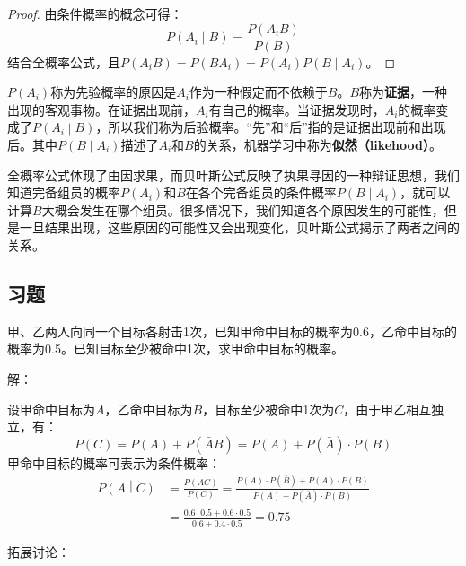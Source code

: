 \begin{proof}
由条件概率的概念可得：
\[
P\left( A_i \middle| B \right) =\frac{P\left( A_iB \right)}{P\left( B \right)}
\]
结合全概率公式，且$P\left( A_iB \right) =P\left( BA_i \right) =P\left( A_i \right) P\left( B \middle| A_i \right) $。
\end{proof}

$P\left( A_i \right) $称为先验概率的原因是$A_i$作为一种假定而不依赖于$B$。$B$称为{\bf 证据}，一种出现的客观事物。在证据出现前，$A_i$有自己的概率。当证据发现时，$A_i$的概率变成了$P\left( A_i \middle| B \right) $，所以我们称为后验概率。“先”和“后”指的是证据出现前和出现后。其中$P\left( B \middle| A_i \right) $描述了$A_i$和$B$的关系，机器学习中称为{\bf 似然（likehood）}。

全概率公式体现了由因求果，而贝叶斯公式反映了执果寻因的一种辩证思想，我们知道完备组员的概率$P\left( A_i \right) $和$B$在各个完备组员的条件概率$P\left( B \middle| A_i \right) $，就可以计算$B$大概会发生在哪个组员。很多情况下，我们知道各个原因发生的可能性，但是一旦结果出现，这些原因的可能性又会出现变化，贝叶斯公式揭示了两者之间的关系。

\subsection{习题}

\begin{example}
甲、乙两人向同一个目标各射击1次，已知甲命中目标的概率为0.6，乙命中目标的概率为0.5。已知目标至少被命中1次，求甲命中目标的概率。
\end{example}

解：

设甲命中目标为$A$，乙命中目标为$B$，目标至少被命中1次为$C$，由于甲乙相互独立，有：
\[
P\left( C \right) =P\left( A \right) +P\left( \bar{A}B \right) =P\left( A \right) +P\left( \bar{A} \right) \cdot P\left( B \right)
\]
甲命中目标的概率可表示为条件概率：
\begin{align*}
P\left( A \middle| C \right) &=\frac{P\left( AC \right)}{P\left( C \right)}=\frac{P\left( A \right) \cdot P\left( \bar{B} \right) +P\left( A \right) \cdot P\left( B \right)}{P\left( A \right) +P\left( \bar{A} \right) \cdot P\left( B \right)} \\
&=\frac{0.6\cdot 0.5+0.6\cdot 0.5}{0.6+0.4\cdot 0.5}=0.75
\end{align*}

拓展讨论：

